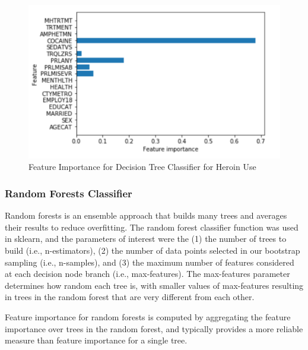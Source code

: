 \documentclass[sigconf]{acmart}
\begin{document}
\begin{figure}[!ht]
  \centering\includegraphics[width=\columnwidth]{images/Figure6.pdf}
  \caption{Feature Importance for Decision Tree Classifier for Heroin Use}
  \label{f:Figure9}
\end{figure}

\subsubsection{Random Forests Classifier}

Random forests is an ensemble approach that builds many trees and averages 
their results to reduce overfitting. The random forest classifier function was 
used in sklearn, and the parameters of interest were the (1) the number of 
trees to build (i.e., n-estimators), (2) the number of data points selected
in our bootstrap sampling (i.e., n-samples), and (3) the maximum number of 
features considered at each decision node branch (i.e., max-features). The
max-features parameter determines how random each tree is, with smaller 
values of max-features resulting in trees in the random forest that are very 
different from each other. 

Feature importance for random forests is computed by aggregating the feature 
importance over trees in the random forest, and typically provides a more 
reliable measure than feature importance for a single tree. 
\end{document}
